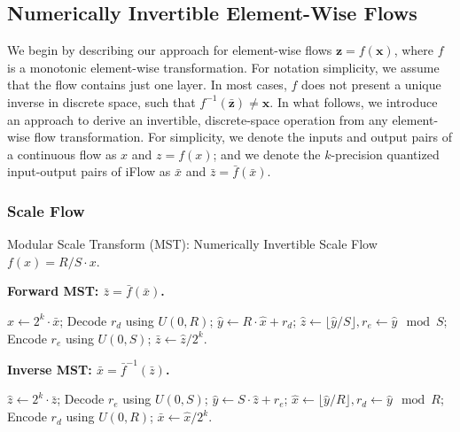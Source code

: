 \documentclass{article}
\newcommand{\quant}[1]{\bar{#1}}
\newcommand{\qv}[1]{\bar{\mathbf{#1}}}
\begin{document}
\subsection{Numerically Invertible Element-Wise Flows}
\label{sec:inv_eleflow}

We begin by describing our approach for element-wise flows $\mathbf{z} = f (\mathbf{x})$, where $f$ is a monotonic element-wise transformation. For notation simplicity, we assume that the flow contains just one layer.
In most cases, $f$ does not present a unique inverse in discrete space, such that $f^{-1} (\qv{z}) \neq \mathbf{x}$. 
In what follows, we introduce an approach to derive an invertible, discrete-space operation from any element-wise flow transformation.
For simplicity, we denote the inputs and output pairs of a continuous flow as $x$ and $z=f(x)$; and we denote the $k$-precision quantized input-output pairs of iFlow as $\quant{x}$ and $\quant{z} = \quant{f} (\quant{x})$.

\subsubsection{Scale Flow}
\label{sec:scale_eleflow}

\begin{algorithm}[h]
\small
\caption{Modular Scale Transform (MST): Numerically Invertible Scale Flow $f(x) = R/S \cdot x$.}
\begin{multicols}{2} 
\textbf{Forward MST: $\bar{z} = \bar{f} (\bar{x})$.} 

\begin{algorithmic}[1]
\STATE $\hat{x} \gets 2^k \cdot \bar{x}$;
\STATE Decode $r_d$ using $U(0, R)$; $\hat{y} \gets R \cdot \hat{x} + r_d$;
\STATE $\hat{z} \gets \lfloor \hat{y} / S \rfloor, r_e \gets \hat{y} \mod S$;
\STATE Encode $r_e$ using $U(0, S)$;
\RETURN $\bar{z} \gets \hat{z} / 2^k$.
\end{algorithmic}

\textbf{Inverse MST: $\bar{x} = \bar{f}^{-1} (\bar{z})$.} 

\begin{algorithmic}[1]
\STATE $\hat{z} \gets 2^k \cdot \bar{z}$;
\STATE Decode $r_e$ using $U(0, S)$; $\hat{y} \gets S \cdot \hat{z} + r_e$;
\STATE $\hat{x} \gets \lfloor \hat{y} / R \rfloor, r_d \gets \hat{y} \mod R$;
\STATE Encode $r_d$ using $U(0, R)$;
\RETURN $\bar{x} \gets \hat{x} / 2^k$.
\end{algorithmic}
\end{multicols}
\vspace{-8pt}
\label{alg:mst}
\end{algorithm}
\end{document}
